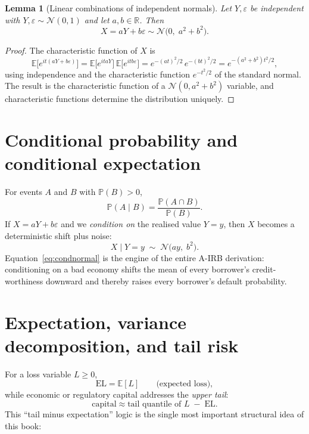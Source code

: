 \documentclass[11pt,a4paper]{report}
\theoremstyle{definition}
\theoremstyle{plain}
\newtheorem{lemma}[definition]{Lemma}
\newcommand{\EL}{\mathrm{EL}}
\begin{document}
\begin{lemma}[Linear combinations of independent normals]
\label{lem:linnorm}
Let $Y,\varepsilon$ be independent with
$Y,\varepsilon\sim\mathcal{N}(0,1)$ and let $a,b\in\mathbb{R}$. Then
\begin{equation}
  X=aY+b\varepsilon \sim \mathcal{N}\!\bigl(0,\; a^{2}+b^{2}\bigr).
\end{equation}
\end{lemma}

\begin{proof}
The characteristic function of $X$ is
\begin{equation}
  \mathbb{E}\bigl[e^{it(aY+b\varepsilon)}\bigr]
  =\mathbb{E}\bigl[e^{itaY}\bigr]\,\mathbb{E}\bigl[e^{itb\varepsilon}\bigr]
  =e^{-(at)^{2}/2}\,e^{-(bt)^{2}/2}
  =e^{-(a^{2}+b^{2})t^{2}/2},
\end{equation}
using independence and the characteristic function
$e^{-t^{2}/2}$ of the standard normal. The result is the characteristic
function of a $\mathcal{N}(0,a^{2}+b^{2})$ variable, and
characteristic functions determine the distribution uniquely.
\end{proof}

\section{Conditional probability and conditional expectation}

For events $A$ and $B$ with $\mathbb{P}(B)>0$,
\begin{equation}
  \mathbb{P}(A\mid B)=\frac{\mathbb{P}(A\cap B)}{\mathbb{P}(B)} .
\end{equation}
If $X=aY+b\varepsilon$ and we \emph{condition on} the realised value
$Y=y$, then $X$ becomes a deterministic shift plus noise:
\begin{equation}
  X \mid Y=y \;\sim\; \mathcal{N}\!\bigl(ay,\; b^{2}\bigr).
  \label{eq:condnormal}
\end{equation}
Equation~\eqref{eq:condnormal} is the engine of the entire A-IRB
derivation: conditioning on a bad economy shifts the mean of every
borrower's credit-worthiness downward and thereby raises every
borrower's default probability.

\section{Expectation, variance decomposition, and tail risk}

For a loss variable $L\ge 0$,
\begin{equation}
  \EL=\mathbb{E}[L] \qquad\text{(expected loss)},
\end{equation}
while economic or regulatory capital addresses the \emph{upper tail}:
\begin{equation}
  \text{capital} \approx \text{tail quantile of } L \;-\; \EL .
\end{equation}
This ``tail minus expectation'' logic is the single most important
structural idea of this book:
\end{document}
